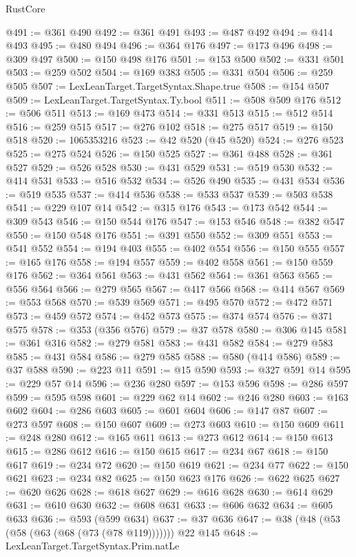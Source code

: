 \begin{lexlean}{RustCore}
\begin{coremodule}
@491 := @361 @490
@492 := @361 @491
@493 := @487 @492
@494 := @414 @493
@495 := @480 @494
@496 := @364 @176
@497 := @173 @496
@498 := @309 @497
@500 := @150 @498 @176
@501 := @153 @500
@502 := @331 @501
@503 := @259 @502
@504 := @169 @383
@505 := @331 @504
@506 := @259 @505
@507 := LexLeanTarget.TargetSyntax.Shape.true
@508 := @154 @507
@509 := LexLeanTarget.TargetSyntax.Ty.bool
@511 := @508 @509 @176
@512 := @506 @511
@513 := @169 @473
@514 := @331 @513
@515 := @512 @514
@516 := @259 @515
@517 := @276 @102
@518 := @275 @517
@519 := @150 @518
@520 := 1065353216
@523 := @42 @520 (@45 @520)
@524 := @276 @523
@525 := @275 @524
@526 := @150 @525
@527 := @361 @488
@528 := @361 @527
@529 := @526 @528
@530 := @431 @529
@531 := @519 @530
@532 := @414 @531
@533 := @516 @532
@534 := @526 @490
@535 := @431 @534
@536 := @519 @535
@537 := @414 @536
@538 := @533 @537
@539 := @503 @538
@541 := @229 @107 @14
@542 := @315 @176
@543 := @173 @542
@544 := @309 @543
@546 := @150 @544 @176
@547 := @153 @546
@548 := @382 @547
@550 := @150 @548 @176
@551 := @391 @550
@552 := @309 @551
@553 := @541 @552
@554 := @194 @403
@555 := @402 @554
@556 := @150 @555
@557 := @165 @176
@558 := @194 @557
@559 := @402 @558
@561 := @150 @559 @176
@562 := @364 @561
@563 := @431 @562
@564 := @361 @563
@565 := @556 @564
@566 := @279 @565
@567 := @417 @566
@568 := @414 @567
@569 := @553 @568
@570 := @539 @569
@571 := @495 @570
@572 := @472 @571
@573 := @459 @572
@574 := @452 @573
@575 := @374 @574
@576 := @371 @575
@578 := @353 (@356 @576)
@579 := @37 @578
@580 := @306 @145
@581 := @361 @316
@582 := @279 @581
@583 := @431 @582
@584 := @279 @583
@585 := @431 @584
@586 := @279 @585
@588 := @580 (@414 @586)
@589 := @37 @588
@590 := @223 @11
@591 := @15 @590
@593 := @327 @591 @14
@595 := @229 @57 @14
@596 := @236 @280
@597 := @153 @596
@598 := @286 @597
@599 := @595 @598
@601 := @229 @62 @14
@602 := @246 @280
@603 := @163 @602
@604 := @286 @603
@605 := @601 @604
@606 := @147 @87
@607 := @273 @597
@608 := @150 @607
@609 := @273 @603
@610 := @150 @609
@611 := @248 @280
@612 := @165 @611
@613 := @273 @612
@614 := @150 @613
@615 := @286 @612
@616 := @150 @615
@617 := @234 @67
@618 := @150 @617
@619 := @234 @72
@620 := @150 @619
@621 := @234 @77
@622 := @150 @621
@623 := @234 @82
@625 := @150 @623 @176
@626 := @622 @625
@627 := @620 @626
@628 := @618 @627
@629 := @616 @628
@630 := @614 @629
@631 := @610 @630
@632 := @608 @631
@633 := @606 @632
@634 := @605 @633
@636 := @593 (@599 @634)
@637 := @37 @636
@647 := @38 (@48 (@53 (@58 (@63 (@68 (@73 (@78 @119))))))) @22 @145
@648 := LexLeanTarget.TargetSyntax.Prim.natLe

\end{coremodule}
\end{lexlean}
